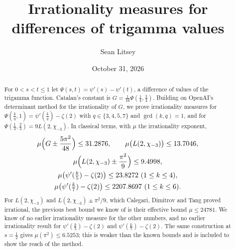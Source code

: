 \documentclass[11pt]{amsart}
\theoremstyle{definition}
\theoremstyle{remark}
\numberwithin{equation}{section}
\newcommand{\MuLamU}{31.2876}
\newcommand{\MuThirdsU}{9.4998}
\newcommand{\MuFifthsU}{23.8272}
\newcommand{\MuSeventhsU}{2207.8697}
\newcommand{\MuChi}{13.7046}
\newcommand{\MuHalvesU}{6.5253}
\begin{document}
\title[Irrationality measures for differences of trigamma values]{Irrationality measures for differences of trigamma values}

\author{Sean Litsey}

\date{October 31, 2026}



\begin{abstract}
For $0<s<t\le1$ let $\Psi(s,t)=\psi'(s)-\psi'(t)$, a difference of values of the trigamma function.
Catalan's constant is $G=\frac1{16}\Psi(\frac14,\frac34)$. Building on OpenAI's determinant method for
the irrationality of $G$, we prove irrationality measures for $\Psi(\frac kq,1)=\psi'(\frac kq)-\zeta(2)$
with $q\in\{3,4,5,7\}$ and $\gcd(k,q)=1$, and for $\Psi(\frac13,\frac23)=9L(2,\chi_{-3})$. In classical
terms, with $\mu$ the irrationality exponent,
\[
\begin{gathered}
 \mu\Bigl(G\pm\frac{5\pi^2}{48}\Bigr)\le \MuLamU,\qquad
 \mu\bigl(L(2,\chi_{-3})\bigr)\le \MuChi,\\
 \mu\Bigl(L(2,\chi_{-3})\pm\frac{\pi^2}9\Bigr)\le \MuThirdsU,\\
 \mu\bigl(\psi'(\tfrac k5)-\zeta(2)\bigr)\le\MuFifthsU\ (1\le k\le4),\\
 \mu\bigl(\psi'(\tfrac k7)-\zeta(2)\bigr)\le\MuSeventhsU\ (1\le k\le6).
\end{gathered}
\]
For $L(2,\chi_{-3})$ and $L(2,\chi_{-3})\pm\pi^2/9$, which Calegari, Dimitrov and Tang proved
irrational, the previous best bound we know of is their effective bound $\mu\le24781$. We know of no
earlier irrationality measure for the other numbers, and no earlier irrationality result for
$\psi'(\frac k5)-\zeta(2)$ and $\psi'(\frac k7)-\zeta(2)$. The same construction at $s=\frac12$ gives
$\mu(\pi^2)\le\MuHalvesU$; this is weaker than the known bounds and is included to show the reach of the method.


\end{abstract}
\end{document}

